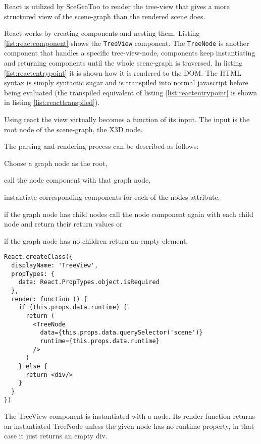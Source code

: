 React is utilized by \gls{SceGraToo} to render the tree-view that gives a more
structured view of the scene-graph than the rendered scene does.

React works by creating components and nesting them. Listing
\ref{list:reactcomponent} shows the \texttt{TreeView} component. The
\texttt{TreeNode} is another component that handles a specific tree-view-node,
components keep instantiating and returning components until the whole
scene-graph is traversed. In listing \ref{list:reactentrypoint} it is shown how
it is rendered to the \gls{DOM}. The \gls{HTML} syntax is simply syntactic sugar and is
transpiled into normal javascript before being evaluated (the transpiled
equivalent of listing \ref{list:reactentrypoint} is shown in listing
\ref{list:reacttranspiled}).

Using react the view virtually becomes a function of its input. The input is the root node of the scene-graph, the \gls{X3D} node.

The parsing and rendering process can be described as follows:
\begin{enumerate*}
  \item Choose a graph node as the root,
  \item call the node component with that graph node,
  \item instantiate corresponding components for each of the nodes attribute,
  \item if the graph node has child nodes call the node component again with each child node and return their return values or
  \item if the graph node has no children return an empty element.
\end{enumerate*}

\begin{listing}
  \begin{verbatim}
React.createClass({
  displayName: 'TreeView',
  propTypes: {
    data: React.PropTypes.object.isRequired
  },
  render: function () {
    if (this.props.data.runtime) {
      return (
        <TreeNode
          data={this.props.data.querySelector('scene')}
          runtime={this.props.data.runtime}
        />
      )
    } else {
      return <div/>
    }
  }
})
  \end{verbatim}
  \caption{The TreeView component is instantiated with a node. Its render function returns an instantiated TreeNode unless the given node has no runtime property, in that case it just returns an empty div.}
  \label{list:reactcomponent}
\end{listing}


